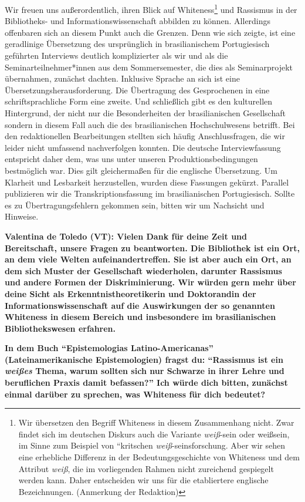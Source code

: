 \documentclass[a4paper,
fontsize=11pt,
oneside,
numbers=noperiodatend,
parskip=half-,
bibliography=totoc,
final
]{scrartcl}
\begin{document}
Wir freuen uns außerordentlich, ihren Blick auf Whiteness\footnote{Wir
  übersetzen den Begriff Whiteness in diesem Zusammenhang nicht. Zwar
  findet sich im deutschen Diskurs auch die Variante \emph{weiß}-sein
  oder weißsein, im Sinne zum Beispiel von ``kritschen
  \emph{weiß}-seinsforschung. Aber wir sehen eine erhebliche Differenz
  in der Bedeutungsgeschichte von Whiteness und dem Attribut
  \emph{weiß}, die im vorliegenden Rahmen nicht zureichend gespiegelt
  werden kann. Daher entscheiden wir uns für die etabliertere englische
  Bezeichnungen. (Anmerkung der Redaktion)} und Rassismus in der
Bibliotheks- und Informationswissenschaft abbilden zu können. Allerdings
offenbaren sich an diesem Punkt auch die Grenzen. Denn wie sich zeigte,
ist eine geradlinige Übersetzung des ursprünglich in brasilianischem
Portugiesisch geführten Interviews deutlich komplizierter als wir und
als die Seminarteilnehmer*innen aus dem Sommersemester, die dies als
Seminarprojekt übernahmen, zunächst dachten. Inklusive Sprache an sich
ist eine Übersetzungsherausforderung. Die Übertragung des Gesprochenen
in eine schriftsprachliche Form eine zweite. Und schließlich gibt es den
kulturellen Hintergrund, der nicht nur die Besonderheiten der
brasilianischen Gesellschaft sondern in diesem Fall auch die des
brasilianischen Hochschulwesens betrifft. Bei den redaktionellen
Bearbeitungen stellten sich häufig Anschlussfragen, die wir leider nicht
umfassend nachverfolgen konnten. Die deutsche Interviewfassung
entspricht daher dem, was uns unter unseren Produktionsbedingungen
bestmöglich war. Dies gilt gleichermaßen für die englische Übersetzung.
Um Klarheit und Lesbarkeit herzustellen, wurden diese Fassungen gekürzt.
Parallel publizieren wir die Transkriptionsfassung im brasilianischen
Portugiesisch. Sollte es zu Übertragungsfehlern gekommen sein, bitten
wir um Nachsicht und Hinweise.

\textbf{Valentina de Toledo (VT): Vielen Dank für deine Zeit und
Bereitschaft, unsere Fragen zu beantworten. Die Bibliothek ist ein Ort,
an dem viele Welten aufeinandertreffen. Sie ist aber auch ein Ort, an
dem sich Muster der Gesellschaft wiederholen, darunter Rassismus und
andere Formen der Diskriminierung. Wir würden gern mehr über deine Sicht
als Erkenntnistheoretikerin und Doktorandin der Informationswissenschaft
auf die Auswirkungen der so genannten Whiteness in diesem Bereich und
insbesondere im brasilianischen Bibliothekswesen erfahren.}

\textbf{In dem Buch \enquote{Epistemologias Latino-Americanas}
(Lateinamerikanische Epistemologien) \linebreak fragst du: \enquote{Rassismus ist ein
\emph{weißes} Thema, warum sollten sich nur Schwarze in ihrer Lehre und
beruflichen Praxis damit befassen?} Ich würde dich bitten, zunächst
einmal darüber zu sprechen, was Whiteness für dich bedeutet?}
\end{document}
